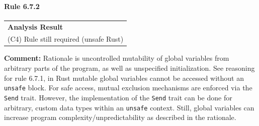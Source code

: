 \paragraph{Rule 6.7.2}
\begin{longtable}{p{13cm}}
\textbf{Analysis Result} \\
(C4) Rule still required (unsafe Rust) \\
\end{longtable}
\textbf{Comment:} Rationale is uncontrolled mutability of global variables from arbitrary parts of the program, as well as unspecified initialization. See reasoning for rule 6.7.1, in Rust mutable global variables cannot be accessed without an \texttt{unsafe} block. For safe access, mutual exclusion mechanisms are enforced via the \texttt{Send} trait. However, the implementation of the \texttt{Send} trait can be done for arbitrary, custom data types within an \texttt{unsafe} context. Still, global variables can increase program complexity/unpredictability as described in the rationale. \\
